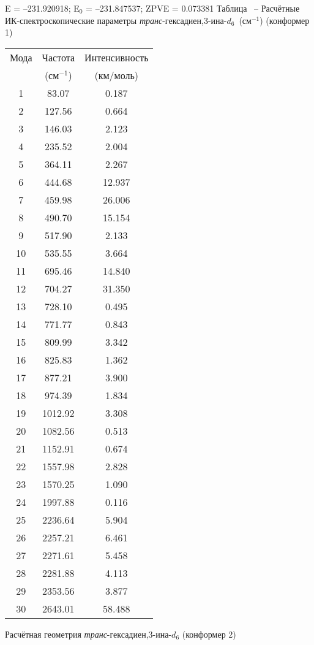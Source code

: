 {E =  --231.920918;    E$_0$ =  --231.847537; ZPVE = 0.073381
\newpage {}
Таблица \thet\, -- Расчётные ИК-спектроскопические параметры {\itshape транс}-гексадиен,3\nobreakdash-ина-$d_6$~(см$^{-1}$) (конформер 1)
 \begin{center}
\begin{tabular}{ccc}
Мода & Частота   & Интенсивность \\
&(см$^{-1}$)&(км/моль)\\
 \hline
     1 &   83.07 &    0.187 \\
     2 &  127.56 &     0.664 \\
     3 &  146.03 &    2.123 \\
     4 &  235.52 &     2.004 \\
     5 &  364.11 &    2.267 \\
     6 &  444.68 &    12.937 \\
     7 &  459.98 &    26.006 \\
     8 &  490.70 &    15.154 \\
     9 &  517.90 &     2.133 \\
    10 &  535.55 &     3.664 \\
    11 &  695.46 &    14.840 \\
    12 &  704.27 &    31.350 \\
    13 &  728.10 &     0.495 \\
    14 &  771.77 &     0.843 \\
    15 &  809.99 &     3.342 \\
    16 &  825.83 &     1.362 \\
    17 &  877.21 &     3.900 \\
    18 &  974.39 &     1.834 \\
    19 & 1012.92 &     3.308 \\
    20 & 1082.56 &     0.513 \\
    21 & 1152.91 &     0.674 \\
    22 & 1557.98 &     2.828 \\
    23 & 1570.25 &     1.090 \\
    24 & 1997.88 &     0.116 \\
    25 & 2236.64 &     5.904 \\
    26 & 2257.21 &     6.461 \\
    27 & 2271.61 &     5.458 \\
    28 & 2281.88 &     4.113 \\
    29 & 2353.56 &     3.877 \\
    30 & 2643.01 &    58.488 \\
 \end{tabular}
\end{center}
\newpage
Расчётная геометрия {\itshape транс}-гексадиен,3\nobreakdash-ина-$d_6$ (конформер 2)

}
